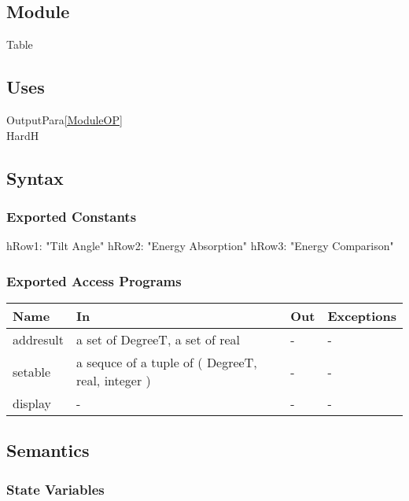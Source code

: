 \documentclass[12pt, titlepage]{article}
\begin{document}
\subsection{Module}
Table\\

\subsection{Uses}
OutputPara\ref{ModuleOP}\\
HardH\\


\subsection{Syntax}

\subsubsection{Exported Constants}

hRow1: "Tilt Angle"
hRow2: "Energy Absorption"
hRow3: "Energy Comparison"

\subsubsection{Exported Access Programs}

\begin{center}
\begin{tabular}{p{2cm} p{5cm} p{5cm} p{2cm}}
\hline
\textbf{Name} & \textbf{In} & \textbf{Out} & \textbf{Exceptions} \\
\hline 
addresult &  a set of DegreeT, a set of real & - & - \\
setable & a sequce of a tuple of ( DegreeT, real, integer ) & - & - \\
display & - & - & - \\

\hline
\end{tabular}
\end{center}


\subsection{Semantics}

\subsubsection{State Variables}
\end{document}
